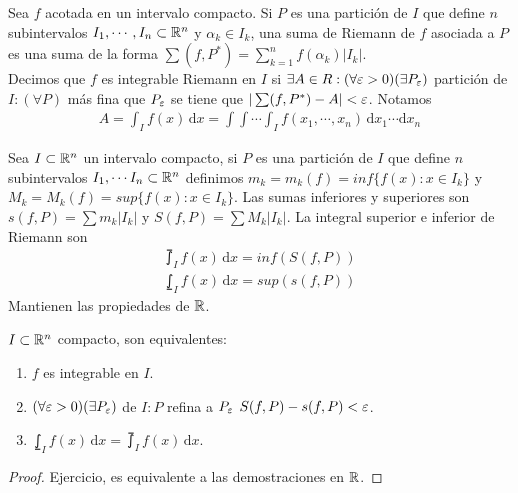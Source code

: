 \begin{definition}
  Sea \(f\) acotada en un intervalo compacto. Si \(P\) es una partición de \(I\) que define \(n\) subintervalos \(I_1, \cdots, I_n \subset \mathbb{R}^n\) y \(\alpha_k \in I_k\), una suma de Riemann de \(f\) asociada a \(P\) es una suma de la forma \(\sum (f, P^*) = \sum_{k = 1}^n f(\alpha_k) |I_k|\). \\
  Decimos que \(f\) es integrable Riemann en \(I\) si \(\exists A \in R : (\forall \varepsilon > 0)(\exists P_{\varepsilon})\) partición de \(I : (\forall P)\) más fina que \(P_{\varepsilon}\) se tiene que \(|\sum(f, P^*) - A| < \varepsilon\).
  Notamos \begin{align*}
    A =  \int_I f(x) \, \mathrm{d}x = \int \int \cdots \int_I f(x_1, \cdots, x_n)\, \mathrm{d}x_1 \cdots \mathrm{d}x_n
  \end{align*}
\end{definition}

\begin{definition}
  Sea \(I \subset \mathbb{R}^n\) un intervalo compacto, si \(P\) es una partición de \(I\) que define \(n\) subintervalos \(I_1, \cdots I_n \subset \mathbb{R}^n\) definimos \(m_k = m_k(f) = inf\{f(x) : x \in I_k\}\) y \(M_k = M_k(f) = sup\{f(x) : x \in I_k\}\).
  Las sumas inferiores y superiores son \(s(f, P) = \sum m_k |I_k|\) y \(S(f, P) = \sum M_k |I_k|\).
  La integral superior e inferior de Riemann son \begin{align*}
    \upint_I f(x) \, \mathrm{d}x = inf(S(f, P))
  \end{align*}
  \begin{align*}
    \lowint_I f(x)\, \mathrm{d}x = sup(s(f, P))
  \end{align*}
  Mantienen las propiedades de \(\mathbb{R}\).
\end{definition}

\begin{theorem}
  \(I \subset \mathbb{R}^n\) compacto, son equivalentes:
  \begin{enumerate}
    \item \(f\) es integrable en \(I\).
    \item \((\forall \varepsilon > 0)(\exists P_{\varepsilon})\) de \(I : P\) refina a \(P_{\varepsilon}\) \(S(f, P) - s(f, P) < \varepsilon\).
    \item \(\lowint_I f(x) \, \mathrm{d}x = \upint_I f(x) \, \mathrm{d}x\).
  \end{enumerate}
  \begin{proof}
    Ejercicio, es equivalente a las demostraciones en \(\mathbb{R}\).
  \end{proof}
\end{theorem}

